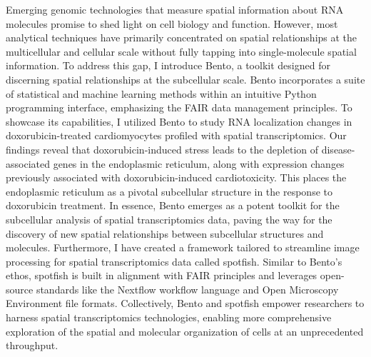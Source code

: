 \documentclass[11pt]{formatting-template}
\begin{document}
\begin{dissertationabstract}
	Emerging genomic technologies that measure spatial information about RNA molecules promise to shed light on cell biology and function. However, most analytical techniques have primarily concentrated on spatial relationships at the multicellular and cellular scale without fully tapping into single-molecule spatial information. To address this gap, I introduce Bento, a toolkit designed for discerning spatial relationships at the subcellular scale. Bento incorporates a suite of statistical and machine learning methods within an intuitive Python programming interface, emphasizing the FAIR data management principles. To showcase its capabilities, I utilized Bento to study RNA localization changes in doxorubicin-treated cardiomyocytes profiled with spatial transcriptomics. Our findings reveal that doxorubicin-induced stress leads to the depletion of disease-associated genes in the endoplasmic reticulum, along with expression changes previously associated with doxorubicin-induced cardiotoxicity. This places the endoplasmic reticulum as a pivotal subcellular structure in the response to doxorubicin treatment. In essence, Bento emerges as a potent toolkit for the subcellular analysis of spatial transcriptomics data, paving the way for the discovery of new spatial relationships between subcellular structures and molecules. Furthermore, I have created a framework tailored to streamline image processing for spatial transcriptomics data called spotfish. Similar to Bento's ethos, spotfish is built in alignment with FAIR principles and leverages open-source standards like the Nextflow workflow language and Open Microscopy Environment file formats. Collectively, Bento and spotfish empower researchers to harness spatial transcriptomics technologies, enabling more comprehensive exploration of the spatial and molecular organization of cells at an unprecedented throughput.
\end{dissertationabstract}

\mainmatter{}







\appendix




\backmatter{}
 

\end{document}
